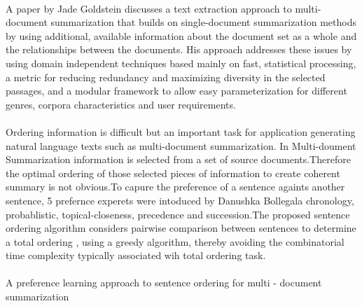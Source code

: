 \paragraph{} A  paper by Jade Goldstein\cite{Publication2} discusses a text extraction approach to multi-document summarization that builds on single-document summarization methods by using additional, available information about the document set as a whole and the relationships between the documents. His approach addresses these issues by using domain independent techniques based mainly on fast, statistical processing, a metric for reducing redundancy and maximizing diversity in the selected passages, and a modular framework to allow easy parameterization for different genres, corpora characteristics and user requirements.
 
\paragraph{} Ordering information is difficult but an important task for application generating natural language texts such as multi-document summarization. In Multi-doument Summarization information is selected from a set of source documents.Therefore the optimal ordering of those selected pieces of information to create coherent summary is not obvious.To capure the preference of a sentence againts another sentence, 5 prefernce experets were intoduced by Danushka Bollegala  chronology, probablistic, topical-closeness, precedence and succession.The proposed sentence ordering algorithm considers pairwise comparison between sentences to determine a total ordering , using a greedy algorithm, thereby avoiding the combinatorial time complexity typically associated wih total ordering task. 
 
 \paragraph{} A preference learning approach to sentence ordering for multi - document summarization